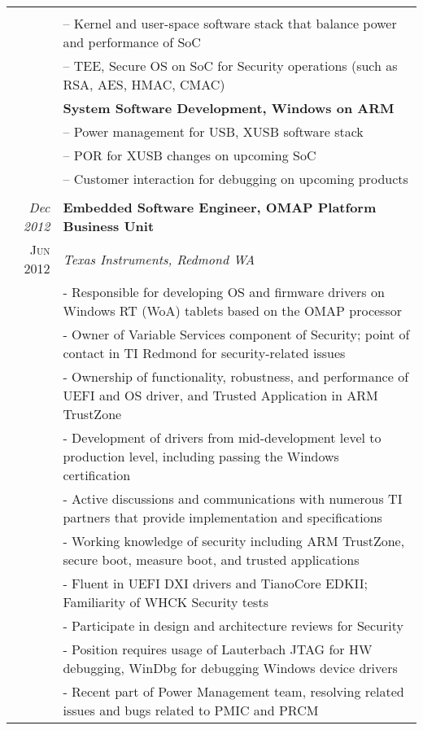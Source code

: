 \documentclass[letter,10pt]{article}
\begin{document}
\begin{tabular}{r|p{16cm}}
{{}}\\
&\footnotesize{
 -- Kernel and user-space software stack that balance power and performance of SoC
}\\
&\footnotesize{
 -- TEE, Secure OS on SoC for Security operations (such as RSA, AES, HMAC, CMAC) 
}\\
&\footnotesize{\textbf{System Software Development, Windows on ARM
}}\\
&\footnotesize{
 -- Power management for USB, XUSB software stack
}\\
&\footnotesize{
 -- POR for XUSB changes on upcoming SoC 
}\\
&\footnotesize{
 -- Customer interaction for debugging on upcoming products 
}\\

\multicolumn{2}{c}{} \\

\emph{Dec 2012} & \textbf{Embedded Software Engineer, OMAP Platform Business Unit}\\
\textsc{Jun 2012}&\emph{Texas Instruments, Redmond WA}\\
&\footnotesize{
 - Responsible for developing OS and firmware drivers on Windows RT (WoA) tablets based on the OMAP processor
}\\
&\footnotesize{
 - Owner of Variable Services component of Security; point of contact in TI Redmond for security-related issues
}\\
&\footnotesize{
 - Ownership of functionality, robustness, and performance of UEFI and OS driver, and Trusted Application in ARM TrustZone 
}\\
&\footnotesize{
 - Development of drivers from mid-development level to production level, including passing the Windows certification
}\\
&\footnotesize{
 - Active discussions and communications with numerous TI partners that provide implementation and specifications
}\\
&\footnotesize{
 - Working knowledge of security including ARM TrustZone, secure boot, measure boot, and trusted applications
}\\
&\footnotesize{
 - Fluent in UEFI DXI drivers and TianoCore EDKII; Familiarity of WHCK Security tests
}\\
&\footnotesize{
 - Participate in design and architecture reviews for Security
}\\
&\footnotesize{
 - Position requires usage of Lauterbach JTAG for HW debugging, WinDbg for debugging Windows device drivers
}\\
&\footnotesize{
 - Recent part of Power Management team, resolving related issues and bugs related to PMIC and PRCM
}\\


\end{tabular}
\end{document}
